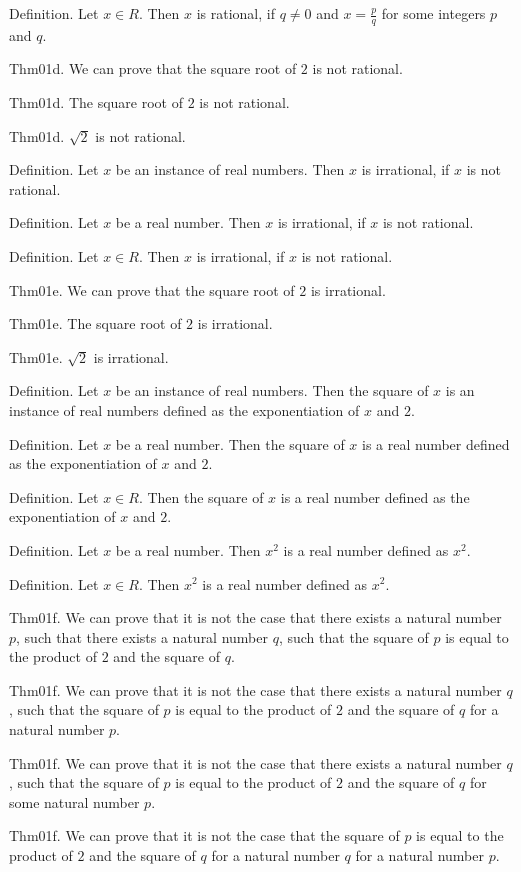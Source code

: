 \documentclass{article}
\begin{document}
Definition. Let $x \in R$. Then $x$ is rational, if $q \neq 0$ and $x = \frac{ p}{q}$ for some integers $p$ and $q$.

Thm01d. We can prove that the square root of $2$ is not rational.

Thm01d. The square root of $2$ is not rational.

Thm01d. $\sqrt{ 2}$ is not rational.

Definition. Let $x$ be an instance of real numbers. Then $x$ is irrational, if $x$ is not rational.

Definition. Let $x$ be a real number. Then $x$ is irrational, if $x$ is not rational.

Definition. Let $x \in R$. Then $x$ is irrational, if $x$ is not rational.

Thm01e. We can prove that the square root of $2$ is irrational.

Thm01e. The square root of $2$ is irrational.

Thm01e. $\sqrt{ 2}$ is irrational.

Definition. Let $x$ be an instance of real numbers. Then the square of $x$ is an instance of real numbers defined as the exponentiation of $x$ and $2$.

Definition. Let $x$ be a real number. Then the square of $x$ is a real number defined as the exponentiation of $x$ and $2$.

Definition. Let $x \in R$. Then the square of $x$ is a real number defined as the exponentiation of $x$ and $2$.

Definition. Let $x$ be a real number. Then $x ^{ 2}$ is a real number defined as $x ^ {2}$.

Definition. Let $x \in R$. Then $x ^{ 2}$ is a real number defined as $x ^ {2}$.

Thm01f. We can prove that it is not the case that there exists a natural number $p$, such that there exists a natural number $q$, such that the square of $p$ is equal to the product of $2$ and the square of $q$.

Thm01f. We can prove that it is not the case that there exists a natural number $q$, such that the square of $p$ is equal to the product of $2$ and the square of $q$ for a natural number $p$.

Thm01f. We can prove that it is not the case that there exists a natural number $q$, such that the square of $p$ is equal to the product of $2$ and the square of $q$ for some natural number $p$.

Thm01f. We can prove that it is not the case that the square of $p$ is equal to the product of $2$ and the square of $q$ for a natural number $q$ for a natural number $p$.
\end{document}
